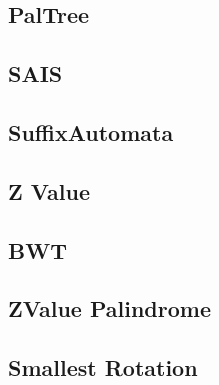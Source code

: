 \documentclass[a4paper,10pt,twocolumn,oneside]{article}
\begin{document}
\subsection{PalTree}


%

\subsection{SAIS}


\subsection{SuffixAutomata}


%

\subsection{Z Value}


\subsection{BWT}


\subsection{ZValue Palindrome}


\subsection{Smallest Rotation}
%


%
\end{document}
